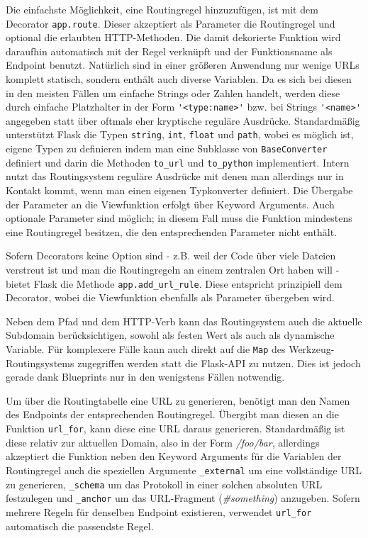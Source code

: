 \begin{description}
Die einfachste Möglichkeit, eine Routingregel hinzuzufügen, ist mit dem Decorator
\lstinline{app.route}. Dieser akzeptiert als Parameter die Routingregel und optional die erlaubten
HTTP-Methoden. Die damit dekorierte Funktion wird daraufhin automatisch mit der Regel verknüpft und
der Funktionsname als Endpoint benutzt. Natürlich sind in einer größeren Anwendung nur wenige URLs
komplett statisch, sondern enthält auch diverse Variablen. Da es sich bei diesen in den meisten
Fällen um einfache Strings oder Zahlen handelt, werden diese durch einfache Platzhalter in der Form
\lstinline{'<type:name>'} bzw. bei Strings \lstinline{'<name>'} angegeben statt über oftmals eher
kryptische reguläre Ausdrücke. Standardmäßig unterstützt Flask die Typen \lstinline{string},
\lstinline{int}, \lstinline{float} und \lstinline{path}, wobei es möglich ist, eigene Typen zu
definieren indem man eine Subklasse von \lstinline{BaseConverter} definiert und darin die Methoden
\lstinline{to_url} und \lstinline{to_python} implementiert. Intern nutzt das Routingsystem reguläre
Ausdrücke mit denen man allerdings nur in Kontakt kommt, wenn man einen eigenen Typkonverter
definiert. Die Übergabe der Parameter an die Viewfunktion erfolgt über Keyword Arguments. Auch
optionale Parameter sind möglich; in diesem Fall muss die Funktion mindestens eine Routingregel
besitzen, die den entsprechenden Parameter nicht enthält.

Sofern Decorators keine Option sind - z.B. weil der Code über viele Dateien verstreut ist
und man die Routingregeln an einem zentralen Ort haben will - bietet Flask die Methode
\lstinline{app.add_url_rule}. Diese entspricht prinzipiell dem Decorator, wobei die Viewfunktion
ebenfalls als Parameter übergeben wird.

Neben dem Pfad und dem HTTP-Verb kann das Routingsystem auch die aktuelle Subdomain berücksichtigen,
sowohl als festen Wert als auch als dynamische Variable. Für komplexere Fälle kann auch direkt auf
die \lstinline{Map} des Werkzeug-Routingsystems zugegriffen werden statt die Flask-API zu nutzen.
Dies ist jedoch gerade dank Blueprints nur in den wenigstens Fällen notwendig.

Um über die Routingtabelle eine URL zu generieren, benötigt man den Namen des Endpoints der
entsprechenden Routingregel. Übergibt man diesen an die Funktion \lstinline{url_for}, kann diese
eine URL daraus generieren. Standardmäßig ist diese relativ zur aktuellen Domain, also in der Form
\emph{/foo/bar}, allerdings akzeptiert die Funktion neben den Keyword Arguments für die Variablen
der Routingregel auch die speziellen Argumente \lstinline{_external} um eine vollständige URL zu
generieren, \lstinline{_schema} um das Protokoll in einer solchen absoluten URL festzulegen und
\lstinline{_anchor} um das URL-Fragment (\emph{\#something}) anzugeben. Sofern mehrere Regeln für
denselben Endpoint existieren, verwendet \lstinline{url_for} automatisch die passendste Regel.


\end{description}
